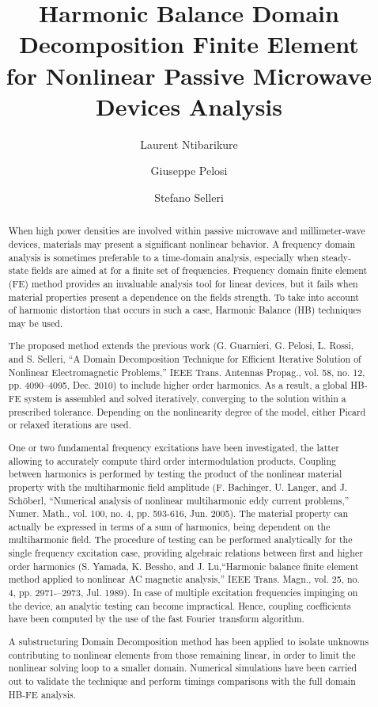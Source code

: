 \documentclass{fem2012}
\title{Harmonic Balance Domain Decomposition Finite Element \\ for Nonlinear Passive Microwave Devices Analysis}
\author[afil1]{Laurent Ntibarikure}
\author[afil1]{Giuseppe Pelosi}
\author[afil1]{Stefano Selleri}
\begin{document}
\begin{abstract}

When high power densities are involved within passive microwave and millimeter-wave devices, materials may present a significant nonlinear behavior. A frequency domain analysis is sometimes preferable to a time-domain analysis, especially when steady-state fields are aimed at for a finite set of frequencies.
Frequency domain finite element (FE) method provides an invaluable analysis tool for linear devices, but it fails when material properties present a dependence on the fields strength. To take into account of harmonic distortion that occurs in such a case, Harmonic Balance (HB) techniques may be used.

The proposed method extends the previous work (G. Guarnieri, G. Pelosi, L. Rossi, and S. Selleri, ``A Domain Decomposition Technique for Efficient Iterative Solution of Nonlinear Electromagnetic Problems,'' IEEE Trans. Antennas Propag., vol. 58, no. 12, pp. 4090--4095, Dec. 2010) to include
higher order harmonics. As a result, a global HB-FE system is assembled and
solved iteratively, converging to the solution within a prescribed tolerance. Depending on the nonlinearity degree of the model, either Picard or relaxed iterations are used. 

One or two fundamental frequency excitations have been investigated, the latter allowing to accurately compute third order intermodulation products. Coupling between harmonics is performed by testing the product of the nonlinear material property with the multiharmonic field amplitude (F. Bachinger, U. Langer, and J. Sch\"oberl, ``Numerical analysis of nonlinear multiharmonic eddy current problems,'' Numer. Math., vol. 100, no. 4, pp. 593-616, Jun. 2005). The material property can actually be expressed in terms of a sum of harmonics, being dependent on the multiharmonic field. The procedure of testing can be performed analytically for the single frequency excitation case, providing algebraic relations between first and higher order harmonics (S. Yamada, K. Bessho, and J. Lu,``Harmonic balance finite element method applied to nonlinear AC magnetic analysis,'' IEEE Trans. Magn., vol. 25, no. 4, pp. 2971-–2973, Jul. 1989). In case of multiple excitation frequencies impinging on the device, an analytic testing can become impractical. Hence, coupling coefficients have been computed by the use of the fast Fourier transform algorithm.

A substructuring Domain Decomposition method has been applied to isolate unknowns contributing to nonlinear elements from those remaining linear, in order to limit the nonlinear solving loop to a smaller domain. Numerical simulations have been carried out to validate the technique and perform timings comparisons with the full domain HB-FE analysis.


\end{abstract}
\end{document}
